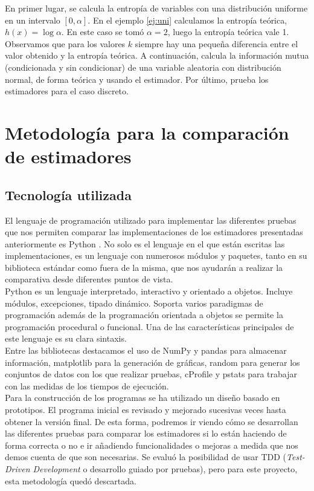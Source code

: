 \documentclass[12pt,a4paper]{report} %
\theoremstyle{definition}
\begin{document}
En primer lugar, se calcula la entropía de variables con una distribución uniforme en un intervalo $[0,\alpha]$. En el ejemplo \ref{ej:uni} calculamos la entropía teórica, $h(x) = \log \alpha$. En este caso se tomó $\alpha = 2$, luego la entropía teórica vale 1. Observamos que para los valores $k$ siempre hay una pequeña diferencia entre el valor obtenido y la entropía teórica. A continuación, calcula la información mutua (condicionada y sin condicionar) de una variable aleatoria con distribución normal, de forma teórica y usando el estimador. Por último, prueba los estimadores para el caso discreto. 


\chapter{Metodología para la comparación de estimadores}
\section{Tecnología utilizada}

El lenguaje de programación utilizado para implementar las diferentes pruebas que nos permiten comparar las implementaciones de los estimadores presentadas anteriormente es Python \cite{python}. No solo es el lenguaje en el que están escritas las implementaciones, es un lenguaje con numerosos módulos y paquetes, tanto en su biblioteca estándar como fuera de la misma, que nos ayudarán a realizar la comparativa desde diferentes puntos de vista.\\

Python es un lenguaje interpretado, interactivo y orientado a objetos. Incluye módulos, excepciones, tipado dinámico. Soporta varios paradigmas de programación además de la programación orientada a objetos se permite la programación procedural o funcional. Una de las características principales de este lenguaje es su clara sintaxis.\\

Entre las bibliotecas destacamos el uso de NumPy \cite{numpy} y pandas \cite{pandas} para almacenar información, matplotlib \cite{matplotlib} para la generación de gráficas, random \cite{random} para generar los conjuntos de datos con los que realizar pruebas, cProfile y pstats \cite{profilers} para trabajar con las medidas de los tiempos de ejecución.\\

Para la construcción de los programas se ha utilizado un diseño basado en prototipos. El programa inicial es revisado y mejorado sucesivas veces hasta obtener la versión final. De esta forma, podremos ir viendo cómo se desarrollan las diferentes pruebas para comparar los estimadores si lo están haciendo de forma correcta o no e ir añadiendo funcionalidades o mejoras a medida que nos demos cuenta de que son necesarias. Se evaluó la posibilidad de usar TDD (\textit{Test-Driven Development} o desarrollo guiado por pruebas), pero para este proyecto, esta metodología quedó descartada.\\
\end{document}
